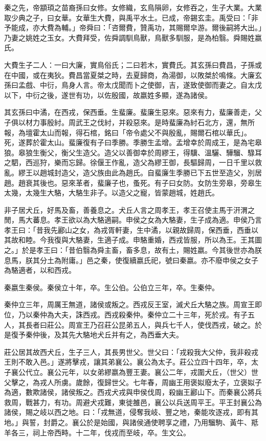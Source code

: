 
\begin{pinyinscope}
秦之先，帝顓頊之苗裔孫曰女修。女修織，玄鳥隕卵，女修吞之，生子大業。大業取少典之子，曰女華。女華生大費，與禹平水土。已成，帝錫玄圭。禹受曰：「非予能成，亦大費為輔。」帝舜曰：「咨爾費，贊禹功，其賜爾皁游。爾後嗣將大出。」乃妻之姚姓之玉女。大費拜受，佐舜調馴鳥獸，鳥獸多馴服，是為柏翳。舜賜姓嬴氏。

大費生子二人：一曰大廉，實鳥俗氏；二曰若木，實費氏。其玄孫曰費昌，子孫或在中國，或在夷狄。費昌當夏桀之時，去夏歸商，為湯御，以敗桀於鳴條。大廉玄孫曰孟戲、中衍，鳥身人言。帝太戊聞而卜之使御，吉，遂致使御而妻之。自太戊以下，中衍之後，遂世有功，以佐殷國，故嬴姓多顯，遂為諸侯。

其玄孫曰中潏，在西戎，保西垂。生蜚廉。蜚廉生惡來。惡來有力，蜚廉善走，父子俱以材力事殷紂。周武王之伐紂，并殺惡來。是時蜚廉為紂石北方，還，無所報，為壇霍太山而報，得石棺，銘曰「帝令處父不與殷亂，賜爾石棺以華氏」。死，遂葬於霍太山。蜚廉復有子曰季勝。季勝生孟增。孟增幸於周成王，是為宅皋狼。皋狼生衡父，衡父生造父。造父以善御幸於周繆王，得驥、溫驪、驊騮、騄耳之駟，西巡狩，樂而忘歸。徐偃王作亂，造父為繆王御，長驅歸周，一日千里以救亂。繆王以趙城封造父，造父族由此為趙氏。自蜚廉生季勝已下五世至造父，別居趙。趙衰其後也。惡來革者，蜚廉子也，蚤死。有子曰女防。女防生旁皋，旁皋生太幾，太幾生大駱，大駱生非子。以造父之寵，皆蒙趙城，姓趙氏。

非子居犬丘，好馬及畜，善養息之。犬丘人言之周孝王，孝王召使主馬于汧渭之閒，馬大蕃息。孝王欲以為大駱適嗣。申侯之女為大駱妻，生子成為適。申侯乃言孝王曰：「昔我先酈山之女，為戎胥軒妻，生中潏，以親故歸周，保西垂，西垂以其故和睦。今我復與大駱妻，生適子成。申駱重婚，西戎皆服，所以為王。王其圖之。」於是孝王曰：「昔伯翳為舜主畜，畜多息，故有土，賜姓嬴。今其後世亦為朕息馬，朕其分土為附庸。」邑之秦，使復續嬴氏祀，號曰秦嬴。亦不廢申侯之女子為駱適者，以和西戎。

秦嬴生秦侯。秦侯立十年，卒。生公伯。公伯立三年，卒。生秦仲。

秦仲立三年，周厲王無道，諸侯或叛之。西戎反王室，滅犬丘大駱之族。周宣王即位，乃以秦仲為大夫，誅西戎。西戎殺秦仲。秦仲立二十三年，死於戎。有子五人，其長者曰莊公。周宣王乃召莊公昆弟五人，與兵七千人，使伐西戎，破之。於是復予秦仲後，及其先大駱地犬丘并有之，為西垂大夫。

莊公居其故西犬丘，生子三人，其長男世父。世父曰：「戎殺我大父仲，我非殺戎王則不敢入邑。」遂將擊戎，讓其弟襄公。襄公為太子。莊公立四十四年，卒，太子襄公代立。襄公元年，以女弟繆嬴為豐王妻。襄公二年，戎圍犬丘，（世父）世父擊之，為戎人所虜。歲餘，復歸世父。七年春，周幽王用褒姒廢太子，立褒姒子為適，數欺諸侯，諸侯叛之。西戎犬戎與申侯伐周，殺幽王酈山下。而秦襄公將兵救周，戰甚力，有功。周避犬戎難，東徙雒邑，襄公以兵送周平王。平王封襄公為諸侯，賜之岐以西之地。曰：「戎無道，侵奪我岐、豐之地，秦能攻逐戎，即有其地。」與誓，封爵之。襄公於是始國，與諸侯通使聘享之禮，乃用騮駒、黃牛、羝羊各三，祠上帝西畤。十二年，伐戎而至岐，卒。生文公。


\end{pinyinscope}

